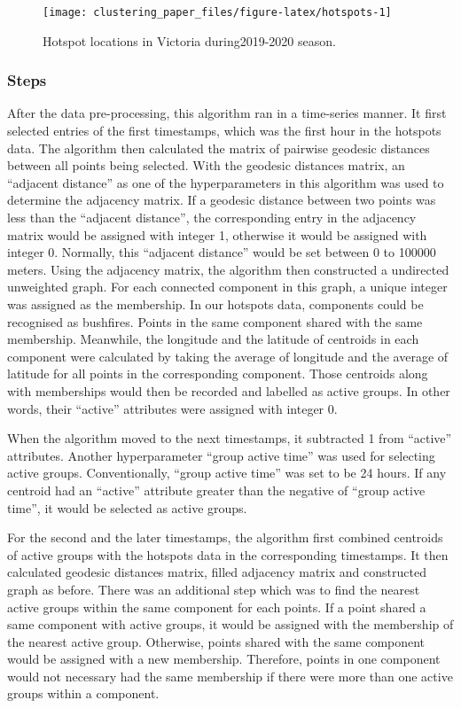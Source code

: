 \begin{Schunk}
\begin{figure}
\texttt{[image: clustering\_paper\_files/figure-latex/hotspots-1]} \caption[Hotspot locations in Victoria during2019-2020 season]{Hotspot locations in Victoria during2019-2020 season.}\label{fig:hotspots}
\end{figure}
\end{Schunk}

\hypertarget{steps}{%
\subsubsection{Steps}\label{steps}}

After the data pre-processing, this algorithm ran in a time-series
manner. It first selected entries of the first timestamps, which was the
first hour in the hotspots data. The algorithm then calculated the
matrix of pairwise geodesic distances between all points being selected.
With the geodesic distances matrix, an ``adjacent distance'' as one of
the hyperparameters in this algorithm was used to determine the
adjacency matrix. If a geodesic distance between two points was less
than the ``adjacent distance'', the corresponding entry in the adjacency
matrix would be assigned with integer 1, otherwise it would be assigned
with integer 0. Normally, this ``adjacent distance'' would be set
between 0 to 100000 meters. Using the adjacency matrix, the algorithm
then constructed a undirected unweighted graph. For each connected
component in this graph, a unique integer was assigned as the
membership. In our hotspots data, components could be recognised as
bushfires. Points in the same component shared with the same membership.
Meanwhile, the longitude and the latitude of centroids in each component
were calculated by taking the average of longitude and the average of
latitude for all points in the corresponding component. Those centroids
along with memberships would then be recorded and labelled as active
groups. In other words, their ``active'' attributes were assigned with
integer 0.

When the algorithm moved to the next timestamps, it subtracted 1 from
``active'' attributes. Another hyperparameter ``group active time'' was
used for selecting active groups. Conventionally, ``group active time''
was set to be 24 hours. If any centroid had an ``active'' attribute
greater than the negative of ``group active time'', it would be selected
as active groups.

For the second and the later timestamps, the algorithm first combined
centroids of active groups with the hotspots data in the corresponding
timestamps. It then calculated geodesic distances matrix, filled
adjacency matrix and constructed graph as before. There was an
additional step which was to find the nearest active groups within the
same component for each points. If a point shared a same component with
active groups, it would be assigned with the membership of the nearest
active group. Otherwise, points shared with the same component would be
assigned with a new membership. Therefore, points in one component would
not necessary had the same membership if there were more than one active
groups within a component.

